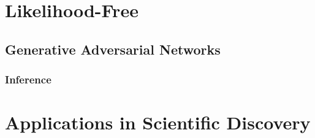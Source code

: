 	\section{Likelihood-Free} %

		\subsection{Generative Adversarial Networks} %

			\subsubsection{Inference} %

	\section{Applications in Scientific Discovery} %
